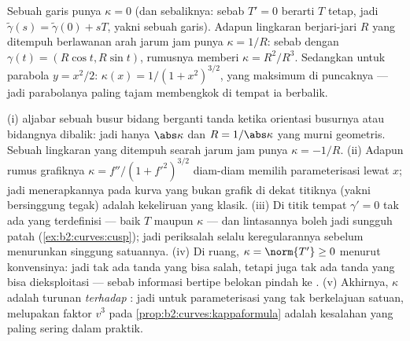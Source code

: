 \begin{example}\label{ex:b2:curves:kappaexamples}
Sebuah garis punya $\kappa = 0$ (dan sebaliknya: sebab $T' = 0$ berarti $T$
tetap, jadi $\tilde\gamma(s) = \tilde\gamma(0) + sT$, yakni sebuah garis). Adapun
lingkaran berjari-jari $R$ yang ditempuh berlawanan arah jarum jam punya $\kappa = 1/R$:
sebab dengan $\gamma(t) = (R\cos t, R\sin t)$, rumusnya memberi $\kappa =
R^2/R^3$. Sedangkan untuk parabola $y = x^2/2$: $\kappa(x) = 1/(1 +
x^2)^{3/2}$, yang maksimum di puncaknya --- jadi parabolanya paling tajam
membengkok di tempat ia berbalik.
\end{example}

\begin{remark}
(i)  aljabar sebuah busur bidang berganti tanda ketika
orientasi busurnya atau bidangnya dibalik: jadi hanya
$\abs\kappa$ dan $R = 1/\abs\kappa$ yang murni geometris. Sebuah
lingkaran yang ditempuh searah jarum jam punya $\kappa = -1/R$. (ii) Adapun
rumus grafiknya $\kappa = f''/(1 + f'^2)^{3/2}$ diam-diam
memilih parameterisasi lewat $x$; jadi menerapkannya pada kurva
yang bukan grafik di dekat titiknya (yakni bersinggung tegak) adalah
kekeliruan yang klasik. (iii) Di titik tempat $\gamma' = 0$
tak ada yang terdefinisi --- baik $T$ maupun $\kappa$ --- dan
lintasannya boleh jadi sungguh patah
(\cref{ex:b2:curves:cusp}); jadi periksalah selalu keregularannya sebelum
menurunkan singgung satuannya. (iv) Di ruang, $\kappa =
\norm{T'} \geq 0$ menurut konvensinya: jadi tak ada tanda yang bisa
salah, tetapi juga tak ada tanda yang bisa dieksploitasi --- sebab
informasi bertipe belokan pindah ke . (v) Akhirnya, $\kappa$ adalah
turunan \emph{terhadap }: jadi untuk
parameterisasi yang tak berkelajuan satuan, melupakan faktor $v^3$
pada \cref{prop:b2:curves:kappaformula} adalah kesalahan yang paling sering
dalam praktik.
\end{remark}

